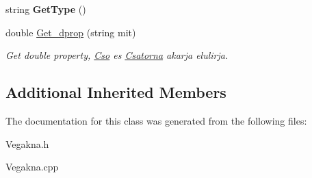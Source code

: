 \begin{DoxyCompactItemize}
\item 
string {\bfseries Get\+Type} ()\hypertarget{class_vegakna_a623a4d644d9b76f48358738df22b9865}{}\label{class_vegakna_a623a4d644d9b76f48358738df22b9865}

\item 
double \hyperlink{class_vegakna_a262a9880ff91b0d2f0cf3c6f28641913}{Get\+\_\+dprop} (string mit)\hypertarget{class_vegakna_a262a9880ff91b0d2f0cf3c6f28641913}{}\label{class_vegakna_a262a9880ff91b0d2f0cf3c6f28641913}

\begin{DoxyCompactList}\small\item\em Get double property, \hyperlink{class_cso}{Cso} es \hyperlink{class_csatorna}{Csatorna} akarja elulirja. \end{DoxyCompactList}\end{DoxyCompactItemize}
\subsection*{Additional Inherited Members}


The documentation for this class was generated from the following files\+:\begin{DoxyCompactItemize}
\item 
Vegakna.\+h\item 
Vegakna.\+cpp\end{DoxyCompactItemize}
